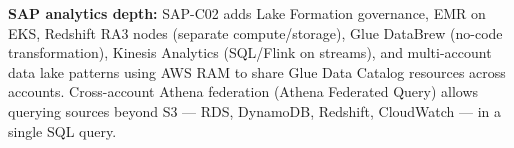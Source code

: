 \begin{sapdepth}
\textbf{SAP analytics depth:} SAP-C02 adds Lake Formation governance, EMR on EKS,
Redshift RA3 nodes (separate compute/storage), Glue DataBrew (no-code transformation),
Kinesis Analytics (SQL/Flink on streams), and multi-account data lake patterns using
AWS RAM to share Glue Data Catalog resources across accounts.
Cross-account Athena federation (Athena Federated Query) allows querying sources beyond S3 --- RDS, DynamoDB, Redshift, CloudWatch --- in a single SQL query.
\end{sapdepth}
